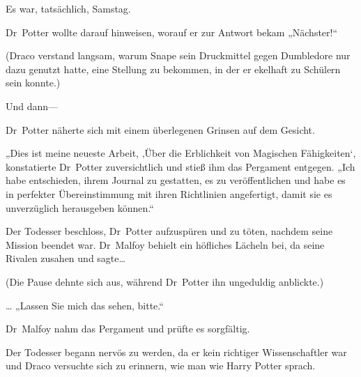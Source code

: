 Es war, tatsächlich, Samstag.

Dr~Potter wollte darauf hinweisen, worauf er zur Antwort bekam „Nächster!“

(Draco verstand langsam, warum Snape sein Druckmittel gegen Dumbledore nur dazu genutzt hatte, eine Stellung zu bekommen, in der er ekelhaft zu Schülern sein konnte.)

Und dann—

Dr~Potter näherte sich mit einem überlegenen Grinsen auf dem Gesicht.

„Dies ist meine neueste Arbeit, ‚Über die Erblichkeit von Magischen Fähigkeiten‘, konstatierte Dr~Potter zuversichtlich und stieß ihm das Pergament entgegen. „Ich habe entschieden, ihrem Journal zu gestatten, es zu veröffentlichen und habe es in perfekter Übereinstimmung mit ihren Richtlinien angefertigt, damit sie es unverzüglich herausgeben können.“

Der Todesser beschloss, Dr~Potter aufzuspüren und zu töten, nachdem seine Mission beendet war. Dr~Malfoy behielt ein höfliches Lächeln bei, da seine Rivalen zusahen und sagte…

(Die Pause dehnte sich aus, während Dr~Potter ihn ungeduldig anblickte.)

… „Lassen Sie mich das sehen, bitte.“

Dr~Malfoy nahm das Pergament und prüfte es sorgfältig.

Der Todesser begann nervös zu werden, da er kein richtiger Wissenschaftler war und Draco versuchte sich zu erinnern, wie man wie Harry Potter sprach.

